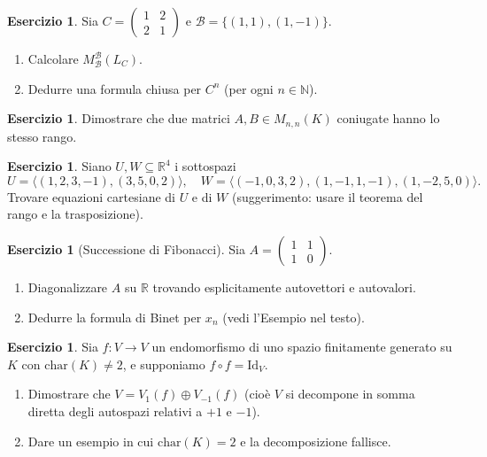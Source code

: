 \documentclass[11pt, a4paper]{book}
\theoremstyle{definition}
\newtheorem{esercizio}[definizione]{Esercizio}
\theoremstyle{plain}
\theoremstyle{remark}
\newcommand{\N}{\mathbb{N}}
\newcommand{\R}{\mathbb{R}}
\newcommand{\Id}{\mathrm{Id}}
\begin{document}
\begin{esercizio}
Sia $C = \begin{pmatrix} 1 & 2 \\ 2 & 1 \end{pmatrix}$ e $\mathcal{B} = \{(1,1),(1,-1)\}$.
\begin{enumerate}
  \item Calcolare $M^\mathcal{B}_\mathcal{B}(L_C)$.
  \item Dedurre una formula chiusa per $C^n$ (per ogni $n \in \N$).
\end{enumerate}
\end{esercizio}

\begin{esercizio}
Dimostrare che due matrici $A, B \in M_{n,n}(K)$ coniugate hanno lo stesso rango.
\end{esercizio}

\begin{esercizio}
Siano $U, W \subseteq \R^4$ i sottospazi
\[
  U = \langle (1,2,3,-1),(3,5,0,2)\rangle, \quad W = \langle (-1,0,3,2),(1,-1,1,-1),(1,-2,5,0)\rangle.
\]
Trovare equazioni cartesiane di $U$ e di $W$ (suggerimento: usare il teorema del rango e la trasposizione).
\end{esercizio}

\begin{esercizio}[Successione di Fibonacci]
Sia $A = \begin{pmatrix} 1 & 1 \\ 1 & 0 \end{pmatrix}$.
\begin{enumerate}
  \item Diagonalizzare $A$ su $\R$ trovando esplicitamente autovettori e autovalori.
  \item Dedurre la formula di Binet per $x_n$ (vedi l'Esempio nel testo).
\end{enumerate}
\end{esercizio}

\begin{esercizio}
Sia $f \colon V \to V$ un endomorfismo di uno spazio finitamente generato su $K$ con $\mathrm{char}(K) \neq 2$, e supponiamo $f \circ f = \Id_V$.
\begin{enumerate}
  \item Dimostrare che $V = V_1(f) \oplus V_{-1}(f)$ (cioè $V$ si decompone in somma diretta degli autospazi relativi a $+1$ e $-1$).
  \item Dare un esempio in cui $\mathrm{char}(K) = 2$ e la decomposizione fallisce.
\end{enumerate}
\end{esercizio}
\end{document}

